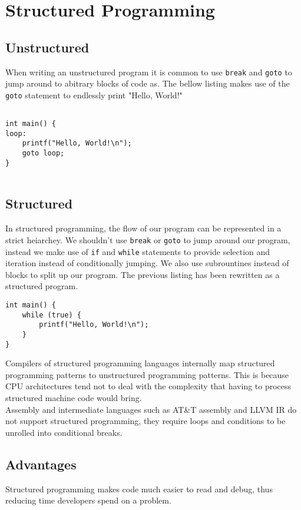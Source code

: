 \documentclass{article}
\begin{document}
\section{Structured Programming}

\subsection{Unstructured}
When writing an unstructured program it is common to use \lstinline{break} and \lstinline{goto} to jump around to abitrary
blocks of code as. The bellow listing makes use of the \lstinline{goto} statement to endlessly print "Hello, World!"

\begin{lstlisting}

int main() {
loop:
	printf("Hello, World!\n");
	goto loop;
}


\end{lstlisting}

\subsection{Structured}
In structured programming, the flow of our program can be represented in a strict heiarchey. We shouldn't use \lstinline{break} or
\lstinline{goto} to jump around our program, instead we make use of \lstinline{if} and \lstinline{while} statements to provide
selection and iteration instead of conditionally jumping. We also use subrountines instead of blocks to split up our program.
The previous listing has been rewritten as a structured program.

\begin{lstlisting}
int main() {
	while (true) {
		printf("Hello, World!\n");
	}
}
\end{lstlisting}
Compilers of structured programming languages internally map structured programming patterns to unstructured programming patterns.
This is because CPU architectures tend not to deal with the complexity that having to process structured machine code
would bring. 
\\
Assembly and intermediate languages such as AT\&T assembly and LLVM IR do not support structured programming, they require
loops and conditions to be unrolled into conditional breaks.

\subsection{Advantages}
Structured programming makes code much easier to read and debug, thus reducing time developers spend on a problem.
\end{document}
